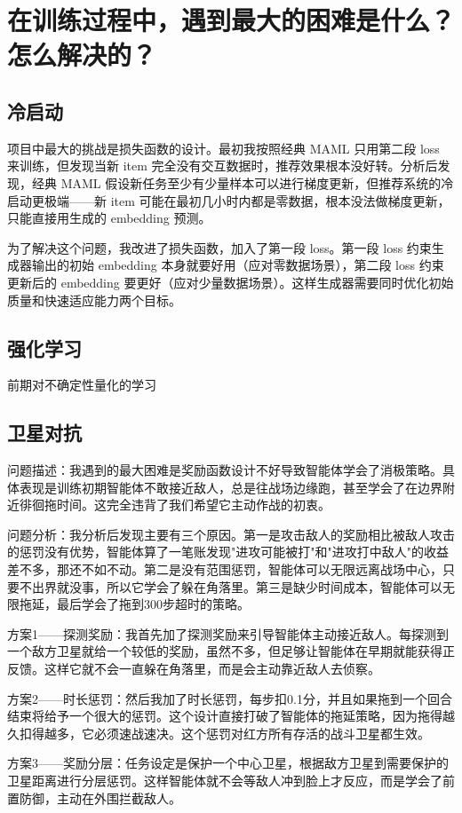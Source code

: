 \documentclass[UTF8]{ctexart}
\begin{document}
\section{在训练过程中，遇到最大的困难是什么？怎么解决的？}
\subsection{冷启动}
项目中最大的挑战是损失函数的设计。最初我按照经典 MAML 只用第二段 loss 来训练，但发现当新 item 完全没有交互数据时，推荐效果根本没好转。分析后发现，经典 MAML 假设新任务至少有少量样本可以进行梯度更新，但推荐系统的冷启动更极端——新 item 可能在最初几小时内都是零数据，根本没法做梯度更新，只能直接用生成的 embedding 预测。

为了解决这个问题，我改进了损失函数，加入了第一段 loss。第一段 loss 约束生成器输出的初始 embedding 本身就要好用（应对零数据场景），第二段 loss 约束更新后的 embedding 要更好（应对少量数据场景）。这样生成器需要同时优化初始质量和快速适应能力两个目标。
\subsection{强化学习}
前期对不确定性量化的学习
\subsection{卫星对抗}
问题描述：我遇到的最大困难是奖励函数设计不好导致智能体学会了消极策略。具体表现是训练初期智能体不敢接近敌人，总是往战场边缘跑，甚至学会了在边界附近徘徊拖时间。这完全违背了我们希望它主动作战的初衷。

问题分析：我分析后发现主要有三个原因。第一是攻击敌人的奖励相比被敌人攻击的惩罚没有优势，智能体算了一笔账发现"进攻可能被打"和"进攻打中敌人"的收益差不多，那还不如不动。第二是没有范围惩罚，智能体可以无限远离战场中心，只要不出界就没事，所以它学会了躲在角落里。第三是缺少时间成本，智能体可以无限拖延，最后学会了拖到300步超时的策略。

方案1——探测奖励：我首先加了探测奖励来引导智能体主动接近敌人。每探测到一个敌方卫星就给一个较低的奖励，虽然不多，但足够让智能体在早期就能获得正反馈。这样它就不会一直躲在角落里，而是会主动靠近敌人去侦察。

方案2——时长惩罚：然后我加了时长惩罚，每步扣0.1分，并且如果拖到一个回合结束将给予一个很大的惩罚。这个设计直接打破了智能体的拖延策略，因为拖得越久扣得越多，它必须速战速决。这个惩罚对红方所有存活的战斗卫星都生效。

方案3——奖励分层：任务设定是保护一个中心卫星，根据敌方卫星到需要保护的卫星距离进行分层惩罚。这样智能体就不会等敌人冲到脸上才反应，而是学会了前置防御，主动在外围拦截敌人。
\end{document}
